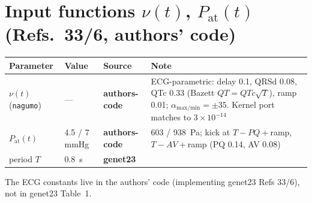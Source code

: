 \documentclass[10pt]{article}
\newcommand{\gen}{\textcolor{cgen}{\textbf{genet23}}}
\newcommand{\code}{\textcolor{ccode}{\textbf{authors-code}}}
\begin{document}
\section*{Input functions $\nu(t)$, $P_\text{at}(t)$ (Refs.~33/6, authors' code)}
\begin{longtable}{l l l P{6.6cm}}
\toprule Parameter & Value & Source & Note \\ \midrule\endhead
$\nu(t)$ (\texttt{nagumo}) & --- & \code & ECG-parametric: delay 0.1, QRSd 0.08, QTc 0.33 (Bazett $QT{=}QTc\sqrt{T}$), ramp 0.01; $\alpha_\text{max/min}{=}\pm35$. Kernel port matches to $3\times10^{-14}$ \\
$P_\text{at}(t)$ & 4.5 / 7 mmHg & \code & 603 / \SI{938}{Pa}; kick at $T{-}PQ{+}$ramp, $T{-}AV{+}$ramp (PQ 0.14, AV 0.08) \\
period $T$ & \SI{0.8}{s} & \gen & \\
\bottomrule
\end{longtable}
\noindent\footnotesize The ECG constants live in the authors' code (implementing genet23 Refs 33/6), not in genet23 Table~1. \normalsize

\end{document}

